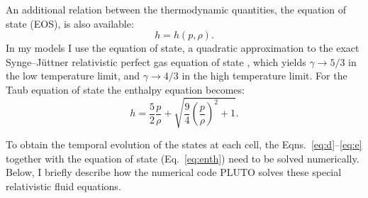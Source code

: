An additional relation between the thermodynamic quantities, the equation of state (EOS), is also available: 
\begin{equation}
h = h(p, \rho).
\label{eq:eos}
\end{equation}
In my models I use the \citet{taub1948a} equation of state, a quadratic approximation to the exact Synge--J\"{u}ttner relativistic perfect gas equation of state \citep{juttner1911a,synge1957a}, which yields $\gamma\rightarrow5/3$ in the low temperature limit, and $\gamma\rightarrow4/3$ in the high temperature limit. For the Taub equation of state the enthalpy equation becomes:
\begin{equation}
h = \frac{5}{2}\frac{p}{\rho} + \sqrt{\frac{9}{4} \left (\frac{p}{\rho} \right )^2 + 1}.
\label{eq:enth}
\end{equation}

To obtain the temporal evolution of the states at each cell, the Eqns.~\ref{eq:d}--\ref{eq:e} together with the equation of state (Eq.~\ref{eq:enth}) need to be solved numerically. Below, I briefly describe how the numerical code PLUTO solves these special relativistic fluid equations.




